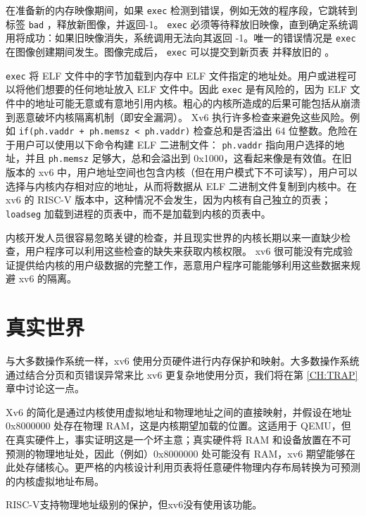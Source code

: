 \documentclass[UTF8]{article}
\begin{document}
在准备新的内存映像期间，如果
    \lstinline{exec}    检测到错误，例如无效的程序段，它跳转到标签
    \lstinline{bad}    ，释放新图像，并返回-1。
    \lstinline{exec}    必须等待释放旧映像，直到确定系统调用将成功：如果旧映像消失，系统调用无法向其返回 -1。唯一的错误情况是
    \lstinline{exec}    在图像创建期间发生。图像完成后，
    \lstinline{exec}   可以提交到新页表
        并释放旧的
        。  

   \lstinline{exec}    将 ELF 文件中的字节加载到内存中 ELF 文件指定的地址处。用户或进程可以将他们想要的任何地址放入 ELF 文件中。因此
    \lstinline{exec}    是有风险的，因为 ELF 文件中的地址可能无意或有意地引用内核。粗心的内核所造成的后果可能包括从崩溃到恶意破坏内核隔离机制（即安全漏洞）。 Xv6 执行许多检查来避免这些风险。例如
    \lstinline{if(ph.vaddr + ph.memsz < ph.vaddr)}    检查总和是否溢出 64 位整数。危险在于用户可以使用以下命令构建 ELF 二进制文件：
    \lstinline{ph.vaddr}    指向用户选择的地址，并且
    \lstinline{ph.memsz}    足够大，总和会溢出到 0x1000，这看起来像是有效值。在旧版本的 xv6 中，用户地址空间也包含内核（但在用户模式下不可读写），用户可以选择与内核内存相对应的地址，从而将数据从 ELF 二进制文件复制到内核中。在 xv6 的 RISC-V 版本中，这种情况不会发生，因为内核有自己独立的页表；
    \lstinline{loadseg}    加载到进程的页表中，而不是加载到内核的页表中。  

内核开发人员很容易忽略关键的检查，并且现实世界的内核长期以来一直缺少检查，用户程序可以利用这些检查的缺失来获取内核权限。 xv6 很可能没有完成验证提供给内核的用户级数据的完整工作，恶意用户程序可能能够利用这些数据来规避 xv6 的隔离。
    \section{真实世界  }     

与大多数操作系统一样，xv6 使用分页硬件进行内存保护和映射。大多数操作系统通过结合分页和页错误异常来比 xv6 更复杂地使用分页，我们将在第    \ref{CH:TRAP}    章中讨论这一点。  

Xv6 的简化是通过内核使用虚拟地址和物理地址之间的直接映射，并假设在地址 0x8000000 处存在物理 RAM，这是内核期望加载的位置。这适用于 QEMU，但在真实硬件上，事实证明这是一个坏主意；真实硬件将 RAM 和设备放置在不可预测的物理地址处，因此（例如）0x8000000 处可能没有 RAM，xv6 期望能够在此处存储核心。更严格的内核设计利用页表将任意硬件物理内存布局转换为可预测的内核虚拟地址布局。  

RISC-V支持物理地址级别的保护，但xv6没有使用该功能。  
\end{document}
